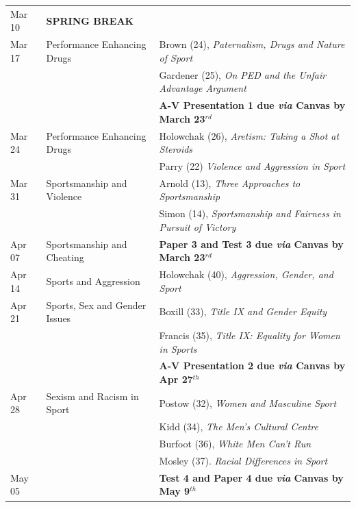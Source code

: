 \documentclass{tufte-handout}
\begin{document}
\begin{fullwidth}
\begin{center}
\begin {tabular} {l l l}
	\rowcolor{blue}
	Mar 10 & \textbf{SPRING BREAK} &  \\
	\rowcolor{lightblue}
	Mar 17 & Performance Enhancing Drugs & Brown (24), \textit{Paternalism, Drugs and Nature of Sport} \\
	\rowcolor{lightblue}
		& & Gardener (25), \textit{On PED and the Unfair Advantage Argument} \\
	\rowcolor{lightblue}
		& & \textbf{A-V Presentation 1 due \textsl{via} Canvas by March 23$^{rd}$} \\
	\rowcolor{blue}
	Mar 24 & Performance Enhancing Drugs &  Holowchak (26), \textit{Aretism: Taking a Shot at Steroids} \\
	\rowcolor{blue}
		& & Parry (22) \textit{Violence and Aggression in Sport}\\
	\rowcolor{lightblue}
	Mar 31 & Sportsmanship and Violence & Arnold (13), \textit{Three Approaches to Sportsmanship} \\
	\rowcolor{lightblue}
		& & Simon (14), \textit{Sportsmanship and Fairness in Pursuit of Victory} \\
	\rowcolor{blue}
	Apr 07 & Sportsmanship and Cheating &  \textbf{Paper 3 and Test 3 due \textsl{via} Canvas by March 23$^{rd}$}\\
	\rowcolor{lightblue}
	Apr 14 & Sports and Aggression & Holowchak (40), \textit{Aggression, Gender, and Sport} \\
	\rowcolor{blue}
	Apr 21 & Sports, Sex and Gender Issues & Boxill (33), \textit{Title IX and Gender Equity} \\
	\rowcolor{blue}
		& & Francis (35), \textit{Title IX: Equality for Women in Sports} \\
	\rowcolor{blue}
		& & \textbf{A-V Presentation 2 due \textsl{via} Canvas by Apr 27$^{th}$} \\
	\rowcolor{lightblue}
	Apr 28 & Sexism and Racism in Sport & Postow (32), \textit{Women and Masculine Sport} \\
	\rowcolor{lightblue}
		& & Kidd (34), \textit{The Men's Cultural Centre} \\
	\rowcolor{lightblue}
		& & Burfoot (36), \textit{White Men Can't Run} \\
	\rowcolor{lightblue}
		& & Mosley (37). \textit{Racial Differences in Sport} \\
	\rowcolor{blue}
		May 05 & & \textbf{Test 4 and Paper 4 due \textsl{via} Canvas by May 9$^{th}$}   \\
	\hline
\end {tabular}
\end{center}

\end{fullwidth}



\end{document}
